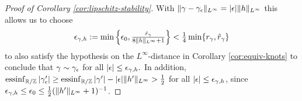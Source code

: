 \begin{proof}[Proof of Corollary {\ref{cor:lipschitz-stability}}]
With $\|\gamma-\gamma_\epsilon\|_{L^\infty}=|\epsilon|\|h\|_{L^\infty}$ this allows
us to choose
\begin{equation}\label{eq:final-epsilon-choice}
\textstyle
\epsilon_{\gamma,h}:=\min\Big\{\epsilon_0,\frac{\hat{r}_\gamma}{8\|h \|_{
L^\infty}+1}\Big\}
<\frac14 \min\{r_\gamma,\hat{r}_\gamma\}
\end{equation}
to also satisfy the hypothesis on the $L^\infty$-distance in Corollary 
\ref{cor:equiv-knots} to conclude that $\gamma\sim\gamma_\epsilon$ for all
$|\epsilon|\le\epsilon_{\gamma,h}.$ In addition, $\operatorname{essinf}_{\mathbb{R}/\mathbb{Z}}|\gamma_\epsilon'|
\ge\operatorname{essinf}_{\mathbb{R}/\mathbb{Z}}|\gamma'|-|\epsilon|\|h'\|_{L^\infty} > \frac12$
for all $|\epsilon|\le\epsilon_{\gamma,h}$, since $\epsilon_{\gamma,h}\le\epsilon_0\le
\tfrac12(\|h'\|_{L^\infty}+1)^{-1}$.
\end{proof}


